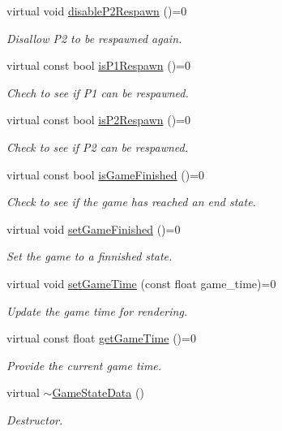 \begin{DoxyCompactItemize}
virtual void \hyperlink{classGameStateData_a5886e86d10a106cf490eaa2433f3e3ea}{disable\-P2\-Respawn} ()=0
\begin{DoxyCompactList}\small\item\em Disallow P2 to be respawned again. \end{DoxyCompactList}\item 
virtual const bool \hyperlink{classGameStateData_a1893643563270c9ca0552761d0da1085}{is\-P1\-Respawn} ()=0
\begin{DoxyCompactList}\small\item\em Chech to see if P1 can be respawned. \end{DoxyCompactList}\item 
virtual const bool \hyperlink{classGameStateData_af65fd6264b007c67e17ffa23e1b91cdb}{is\-P2\-Respawn} ()=0
\begin{DoxyCompactList}\small\item\em Check to see if P2 can be respawned. \end{DoxyCompactList}\item 
virtual const bool \hyperlink{classGameStateData_a96b7a0057780d2fac25569019804428e}{is\-Game\-Finished} ()=0
\begin{DoxyCompactList}\small\item\em Check to see if the game has reached an end state. \end{DoxyCompactList}\item 
virtual void \hyperlink{classGameStateData_a304d37bb9b7844df62139139bd9cbb92}{set\-Game\-Finished} ()=0
\begin{DoxyCompactList}\small\item\em Set the game to a finnished state. \end{DoxyCompactList}\item 
virtual void \hyperlink{classGameStateData_a1573842cc559d329f894add1678ffb03}{set\-Game\-Time} (const float game\-\_\-time)=0
\begin{DoxyCompactList}\small\item\em Update the game time for rendering. \end{DoxyCompactList}\item 
virtual const float \hyperlink{classGameStateData_a0cb5cf167da9dd1929c719778c5d3506}{get\-Game\-Time} ()=0
\begin{DoxyCompactList}\small\item\em Provide the current game time. \end{DoxyCompactList}\item 
virtual \hyperlink{classGameStateData_a1a607dfe4238a54671e51f1cfab34cd8}{$\sim$\-Game\-State\-Data} ()
\begin{DoxyCompactList}\small\item\em Destructor. \end{DoxyCompactList}\end{DoxyCompactItemize}



